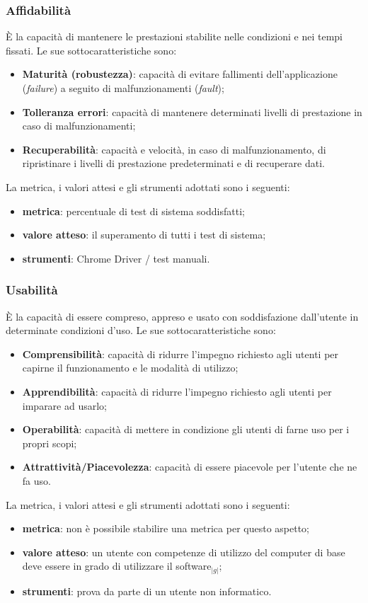 {	\subsubsection{Affidabilità}{
	    \`E la capacità di mantenere le prestazioni stabilite nelle condizioni e nei tempi fissati. Le sue sottocaratteristiche sono:
	    \begin{itemize}
		\item \textbf{Maturità (robustezza)}: capacità di evitare fallimenti dell'applicazione (\textit{failure}) a seguito di malfunzionamenti (\textit{fault});
		\item \textbf{Tolleranza errori}: capacità di mantenere determinati livelli di prestazione in caso di malfunzionamenti;
		\item \textbf{Recuperabilità}: capacità e velocità, in caso di malfunzionamento, di ripristinare i livelli di prestazione predeterminati e di recuperare dati.
	    \end{itemize}
	    La metrica, i valori attesi e gli strumenti adottati sono i seguenti:
	    \begin{itemize}
		\item \textbf{metrica}: percentuale di test di sistema soddisfatti;
		\item \textbf{valore atteso}: il superamento di tutti i test di sistema;
		\item \textbf{strumenti}: Chrome Driver / test manuali.
	    \end{itemize}
	}
	\subsubsection{Usabilità}{
	    \`E la capacità di essere compreso, appreso e usato con soddisfazione dall'utente in determinate condizioni d'uso. Le sue sottocaratteristiche sono:
	    \begin{itemize}
		\item \textbf{Comprensibilità}: capacità di ridurre l'impegno richiesto agli utenti per capirne il funzionamento e le modalità di utilizzo;
		\item \textbf{Apprendibilità}: capacità di ridurre l'impegno richiesto agli utenti per imparare ad usarlo;
		\item \textbf{Operabilità}: capacità di mettere in condizione gli utenti di farne uso per i propri scopi;
		\item \textbf{Attrattività/Piacevolezza}: capacità di essere piacevole per l'utente che ne fa uso.
	    \end{itemize}
	    La metrica, i valori attesi e gli strumenti adottati sono i seguenti:
	    \begin{itemize}
		\item \textbf{metrica}: non è possibile stabilire una metrica per questo aspetto;
		\item \textbf{valore atteso}: un utente con competenze di utilizzo del computer di base deve essere in grado di utilizzare il software$_{|g|}$;
		\item \textbf{strumenti}: prova da parte di un utente non informatico.
	    \end{itemize}
	}
}
